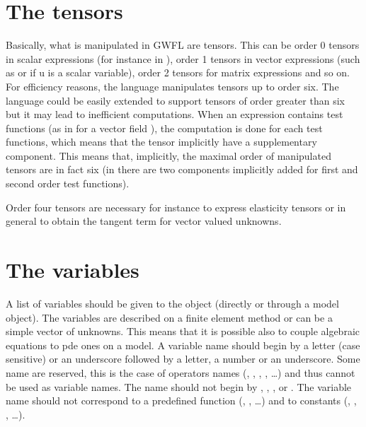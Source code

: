 \documentclass[a4paper,11pt,english]{sphinxmanual}
\begin{document}
\section{The tensors}
\label{\detokenize{userdoc/gasm_high:the-tensors}}
Basically, what is manipulated in GWFL are tensors. This can be order 0 tensors in scalar expressions (for instance in ), order 1 tensors in vector expressions (such as  or  if u is a scalar variable), order 2 tensors for matrix expressions and so on. For efficiency reasons, the language manipulates tensors up to order six. The language could be easily extended to support tensors of order greater than six but it may lead to inefficient computations. When an expression contains test functions (as in  for a vector field ), the computation is done for each test functions, which means that the tensor implicitly have a supplementary component. This means that, implicitly, the maximal order of manipulated tensors are in fact six (in  there are two components implicitly added for first and second order test functions).

Order four tensors are necessary for instance to express elasticity tensors or in general to obtain the tangent term for vector valued unknowns.


\section{The variables}
\label{\detokenize{userdoc/gasm_high:the-variables}}
A list of variables should be given to the  object (directly or through a model object). The variables are described on a finite element method or can be a simple vector of unknowns. This means that it is possible also to couple algebraic equations to pde ones on a model. A variable name should begin by a letter (case sensitive) or an underscore followed by a letter, a number or an underscore. Some name are reserved, this is the case of operators names (, , , , …) and thus cannot be used as variable names. The name should not begin by , , ,  or . The variable name should not correspond to a predefined function (, ,  …) and to constants (, , ,  …).
\end{document}
